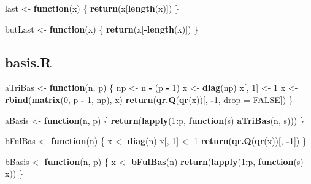 \documentclass[
  12pt,
]{article}
\newenvironment{Shaded}{\begin{snugshade}}{\end{snugshade}}
\newcommand{\AttributeTok}[1]{\textcolor[rgb]{0.13,0.29,0.53}{#1}}
\newcommand{\ConstantTok}[1]{\textcolor[rgb]{0.56,0.35,0.01}{#1}}
\newcommand{\ControlFlowTok}[1]{\textcolor[rgb]{0.13,0.29,0.53}{\textbf{#1}}}
\newcommand{\DecValTok}[1]{\textcolor[rgb]{0.00,0.00,0.81}{#1}}
\newcommand{\FunctionTok}[1]{\textcolor[rgb]{0.13,0.29,0.53}{\textbf{#1}}}
\newcommand{\NormalTok}[1]{#1}
\newcommand{\OtherTok}[1]{\textcolor[rgb]{0.56,0.35,0.01}{#1}}
\newcommand{\SpecialCharTok}[1]{\textcolor[rgb]{0.81,0.36,0.00}{\textbf{#1}}}
\begin{document}
\begin{Shaded}
\begin{Highlighting}[]
\NormalTok{last }\OtherTok{\textless{}{-}} \ControlFlowTok{function}\NormalTok{(x) \{}
  \FunctionTok{return}\NormalTok{(x[}\FunctionTok{length}\NormalTok{(x)])}
\NormalTok{\}}

\NormalTok{butLast }\OtherTok{\textless{}{-}} \ControlFlowTok{function}\NormalTok{(x) \{}
  \FunctionTok{return}\NormalTok{(x[}\SpecialCharTok{{-}}\FunctionTok{length}\NormalTok{(x)])}
\NormalTok{\}}
\end{Highlighting}
\end{Shaded}

\subsection{basis.R}\label{basis.r}

\begin{Shaded}
\begin{Highlighting}[]
\NormalTok{aTriBas }\OtherTok{\textless{}{-}} \ControlFlowTok{function}\NormalTok{(n, p) \{}
\NormalTok{  np }\OtherTok{\textless{}{-}}\NormalTok{ n }\SpecialCharTok{{-}}\NormalTok{ (p }\SpecialCharTok{{-}} \DecValTok{1}\NormalTok{)}
\NormalTok{  x }\OtherTok{\textless{}{-}} \FunctionTok{diag}\NormalTok{(np)}
\NormalTok{  x[, }\DecValTok{1}\NormalTok{] }\OtherTok{\textless{}{-}} \DecValTok{1}
\NormalTok{  x }\OtherTok{\textless{}{-}} \FunctionTok{rbind}\NormalTok{(}\FunctionTok{matrix}\NormalTok{(}\DecValTok{0}\NormalTok{, p }\SpecialCharTok{{-}} \DecValTok{1}\NormalTok{, np), x)}
  \FunctionTok{return}\NormalTok{(}\FunctionTok{qr.Q}\NormalTok{(}\FunctionTok{qr}\NormalTok{(x))[, }\SpecialCharTok{{-}}\DecValTok{1}\NormalTok{, }\AttributeTok{drop =} \ConstantTok{FALSE}\NormalTok{])}
\NormalTok{\}}

\NormalTok{aBasis }\OtherTok{\textless{}{-}} \ControlFlowTok{function}\NormalTok{(n, p) \{}
  \FunctionTok{return}\NormalTok{(}\FunctionTok{lapply}\NormalTok{(}\DecValTok{1}\SpecialCharTok{:}\NormalTok{p, }\ControlFlowTok{function}\NormalTok{(s)}
    \FunctionTok{aTriBas}\NormalTok{(n, s)))}
\NormalTok{\}}

\NormalTok{bFulBas }\OtherTok{\textless{}{-}} \ControlFlowTok{function}\NormalTok{(n) \{}
\NormalTok{  x }\OtherTok{\textless{}{-}} \FunctionTok{diag}\NormalTok{(n)}
\NormalTok{  x[, }\DecValTok{1}\NormalTok{] }\OtherTok{\textless{}{-}} \DecValTok{1}
  \FunctionTok{return}\NormalTok{(}\FunctionTok{qr.Q}\NormalTok{(}\FunctionTok{qr}\NormalTok{(x))[, }\SpecialCharTok{{-}}\DecValTok{1}\NormalTok{])}
\NormalTok{\}}

\NormalTok{bBasis }\OtherTok{\textless{}{-}} \ControlFlowTok{function}\NormalTok{(n, p) \{}
\NormalTok{  x }\OtherTok{\textless{}{-}} \FunctionTok{bFulBas}\NormalTok{(n)}
  \FunctionTok{return}\NormalTok{(}\FunctionTok{lapply}\NormalTok{(}\DecValTok{1}\SpecialCharTok{:}\NormalTok{p, }\ControlFlowTok{function}\NormalTok{(s)}
\NormalTok{    x))}
\NormalTok{\}}


\end{Highlighting}
\end{Shaded}
\end{document}

